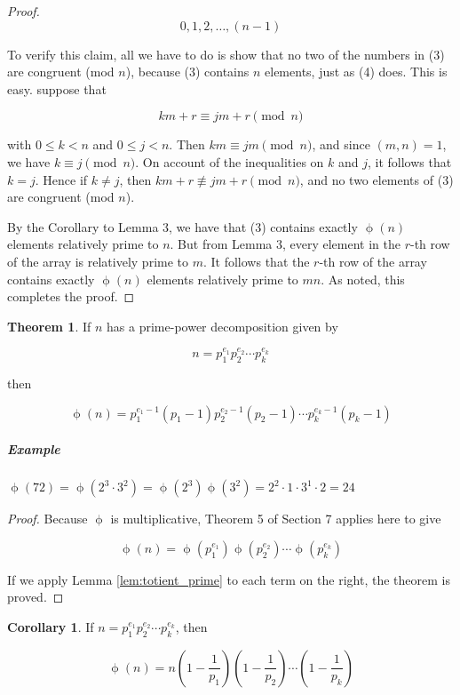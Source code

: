 \documentclass{article}
\theoremstyle{definition} %
\newtheorem{theorem}{Theorem}[section] %
\theoremstyle{definition}
\newtheorem{corollary}{Corollary}[section] %
\theoremstyle{definition}
\newcommand{\tot}{\upphi}
\theoremstyle{definition}
\begin{document}
\begin{proof}
    \begin{equation}
      0, 1, 2, \dots, (n-1)
    \end{equation}
    
    To verify this claim, all we have to do is show that no two of the numbers
    in (3) are congruent (mod $n$), because (3) contains $n$ elements, just
    as (4) does. This is easy. suppose that
    
    \[
      km + r \equiv jm + r \pmod{n}
    \]
    
    with $0 \leq k < n$ and $0 \leq j < n$. Then $km \equiv jm \pmod{n}$, and
    since $(m, n) = 1$, we have $k \equiv j \pmod{n}$. On account of the inequalities
    on $k$ and $j$, it follows that $k = j$. Hence if $k \neq j$, then $km + r \nequiv jm + r \pmod{n}$,
    and no two elements of (3) are congruent (mod $n$).
    
    By the Corollary to Lemma 3, we have that (3) contains exactly $\tot(n)$ elements relatively
    prime to $n$. But from Lemma 3, every element in the $r$-th row of the array is
    relatively prime to $m$. It follows that the $r$-th row of the array contains exactly
    $\tot(n)$ elements relatively prime to $mn$. As noted, this completes the proof.
  \end{proof}
  
  \begin{theorem}
    If $n$ has a prime-power decomposition given by
    
    \[ n = p_1^{e_1} p_2^{e_2} \cdots p_k^{e_k} \]
    
    then
    
    \[ \tot(n) = p_1^{e_1-1}(p_1-1)p_2^{e_2-1}(p_2-1)\cdots p_k^{e_k-1}(p_k-1) \]
  \end{theorem}
  
  \subparagraph{Example} $\tot(72) = \tot(2^3 \cdot 3^2) = \tot(2^3)\tot(3^2) = 2^2 \cdot 1 \cdot 3^1 \cdot 2 = 24$
  
  \begin{proof}
    Because $\tot$ is multiplicative, Theorem 5 of Section 7 applies here to give
    
    \[ \tot(n) = \tot(p_1^{e_1})\tot(p_2^{e_2})\cdots \tot(p_k^{e_k}) \]
    
    If we apply Lemma \ref{lem:totient_prime} to each term on the right, the theorem is proved.
  \end{proof}
  
  \begin{corollary}
    If $n = p_1^{e_1} p_2^{e_2} \cdots p_k^{e_k}$, then
    
    \[ \tot(n) = n\left( 1 - \frac{1}{p_1}\right) \left(1 - \frac{1}{p_2}\right)\cdots\left(1 - \frac{1}{p_k}\right) \]
  \end{corollary}
  
\end{document}
